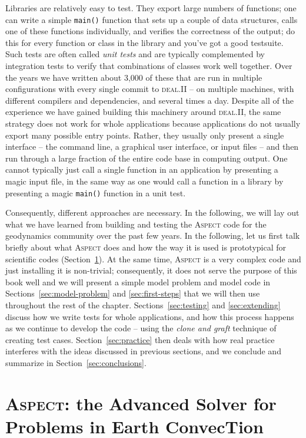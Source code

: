 \documentclass{article}
\newcommand{\dealii}{{\textsc{deal.II}}}
\newcommand{\aspect}{\textsc{Aspect}}
\begin{document}
Libraries are relatively easy to test. They export large numbers of
functions; one can write a simple \texttt{main()} function that sets up a
couple of data structures, calls one of these functions individually, and
verifies the correctness of the output; do
this for every function or class in the library and you've got a good
testsuite. Such tests are
often called \textit{unit tests} and are typically complemented by integration
tests to verify that combinations of classes work well together. Over the
years we have written about 3,000 of these that are run in multiple
configurations with every single commit to \dealii{} -- on multiple machines,
with different compilers and dependencies, and several times a day. Despite
all of the experience we have gained building this machinery around \dealii{},
the same strategy does not work for whole applications because applications do
not usually export many possible entry points. Rather, they usually only
present a single interface -- the command line, a graphical user interface, or
input files -- and then run through a large fraction of the entire code base
in computing output. One cannot typically just call a single function in an
application by presenting a magic input file, in the same way as one would
call a function in a library by presenting a magic \texttt{main()} function in
a unit test.

Consequently, different approaches are necessary. In the following, we will
lay out what we have learned from building and testing the \aspect{} code for the
geodynamics community over the past few years. In the following, let us first
talk briefly about what \aspect{} does and how the way it is used is
prototypical for scientific codes (Section~\ref{sec:aspect}). At the same time,
\aspect{} is a very complex code and just installing it is non-trivial;
consequently, it does not serve the purpose of this book well and we will
present a simple model problem and model code in
Sections~\ref{sec:model-problem} and \ref{sec:first-steps} that we
will then use throughout the rest of the chapter. Sections~\ref{sec:testing}
and \ref{sec:extending}
discuss how we write tests for whole applications, and how this process
happens as we continue to develop the code -- using the
\textit{clone and graft} technique of creating test
cases. Section~\ref{sec:practice} then deals with how real practice interferes
with the ideas discussed in previous sections, and we conclude and summarize
in Section~\ref{sec:conclusions}. 


\section{\aspect{}: the Advanced Solver for Problems in Earth ConvecTion}
\label{sec:aspect}
\end{document}
